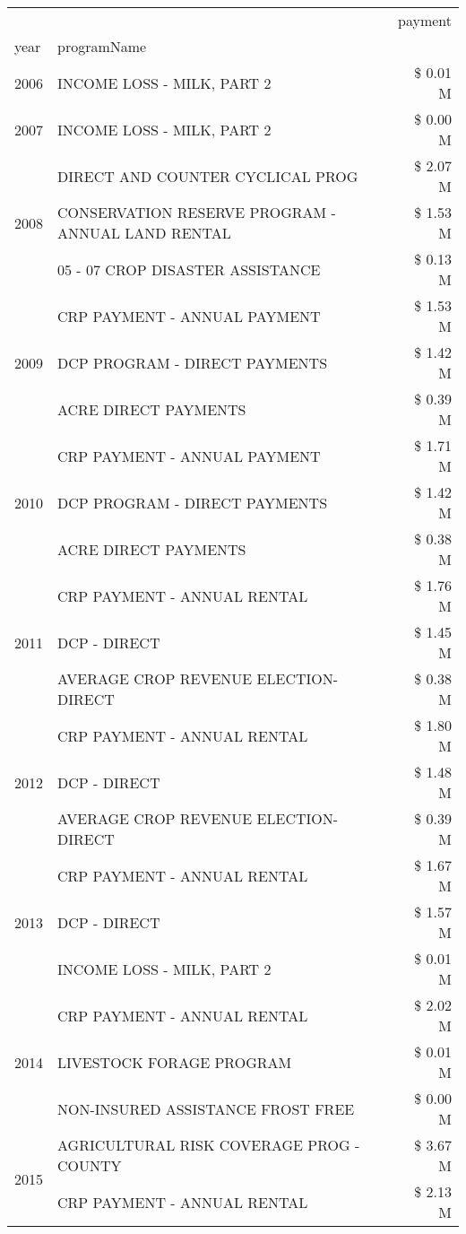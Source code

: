 \begin{tabular}{llr}
\toprule
 &  & payment \\
year & programName &  \\
\midrule
2006 & INCOME LOSS - MILK, PART 2 & \$ 0.01 M \\
\cline{1-3}
2007 & INCOME LOSS - MILK, PART 2 & \$ 0.00 M \\
\cline{1-3}
\multirow[t]{3}{*}{2008} & DIRECT AND COUNTER CYCLICAL PROG & \$ 2.07 M \\
 & CONSERVATION RESERVE PROGRAM - ANNUAL LAND RENTAL & \$ 1.53 M \\
 & 05 - 07 CROP DISASTER ASSISTANCE & \$ 0.13 M \\
\cline{1-3}
\multirow[t]{3}{*}{2009} & CRP PAYMENT - ANNUAL PAYMENT & \$ 1.53 M \\
 & DCP PROGRAM - DIRECT PAYMENTS & \$ 1.42 M \\
 & ACRE DIRECT PAYMENTS & \$ 0.39 M \\
\cline{1-3}
\multirow[t]{3}{*}{2010} & CRP PAYMENT - ANNUAL PAYMENT & \$ 1.71 M \\
 & DCP PROGRAM - DIRECT PAYMENTS & \$ 1.42 M \\
 & ACRE DIRECT PAYMENTS & \$ 0.38 M \\
\cline{1-3}
\multirow[t]{3}{*}{2011} & CRP PAYMENT - ANNUAL RENTAL & \$ 1.76 M \\
 & DCP - DIRECT & \$ 1.45 M \\
 & AVERAGE CROP REVENUE ELECTION-DIRECT & \$ 0.38 M \\
\cline{1-3}
\multirow[t]{3}{*}{2012} & CRP PAYMENT - ANNUAL RENTAL & \$ 1.80 M \\
 & DCP - DIRECT & \$ 1.48 M \\
 & AVERAGE CROP REVENUE ELECTION-DIRECT & \$ 0.39 M \\
\cline{1-3}
\multirow[t]{3}{*}{2013} & CRP PAYMENT - ANNUAL RENTAL & \$ 1.67 M \\
 & DCP - DIRECT & \$ 1.57 M \\
 & INCOME LOSS - MILK, PART 2 & \$ 0.01 M \\
\cline{1-3}
\multirow[t]{3}{*}{2014} & CRP PAYMENT - ANNUAL RENTAL & \$ 2.02 M \\
 & LIVESTOCK FORAGE PROGRAM & \$ 0.01 M \\
 & NON-INSURED ASSISTANCE FROST FREE & \$ 0.00 M \\
\cline{1-3}
\multirow[t]{3}{*}{2015} & AGRICULTURAL RISK COVERAGE PROG - COUNTY & \$ 3.67 M \\
 & CRP PAYMENT - ANNUAL RENTAL & \$ 2.13 M \\

\end{tabular}
